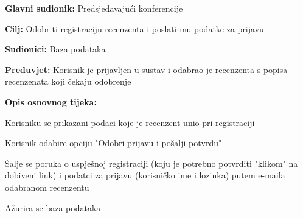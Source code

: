 					\noindent {}
					\begin{packed_item}
						
						\item \textbf{Glavni sudionik: } Predsjedavajući konferencije
						\item  \textbf{Cilj:} Odobriti registraciju recenzenta i poslati mu podatke za prijavu
						\item  \textbf{Sudionici:} Baza podataka
						\item  \textbf{Preduvjet:} Korisnik je prijavljen u sustav i odabrao je recenzenta s popisa recenzenata koji čekaju odobrenje
						\item  \textbf{Opis osnovnog tijeka:}
						
						\item[] \begin{packed_enum}
							
							
							\item Korisniku se prikazani podaci koje je recenzent unio pri registraciji
							\item Korisnik odabire opciju "Odobri prijavu i pošalji potvrdu"
							\item Šalje se poruka o uspješnoj registraciji (koju je potrebno potvrditi "klikom" na dobiveni link) i podatci za prijavu (korisničko ime i lozinka) putem e-maila odabranom recenzentu
							\item Ažurira se baza podataka
							
							
						\end{packed_enum}
						
					\end{packed_item}
					
